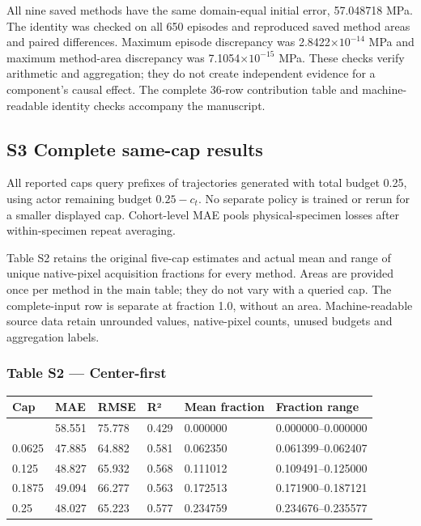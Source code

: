 \documentclass[11pt,a4paper]{article}
\begin{document}
All nine saved methods have the same domain-equal initial error, 57.048718 MPa. The identity was checked on all 650 episodes and reproduced saved method areas and paired differences. Maximum episode discrepancy was 2.8422×\(10^{-14}\) MPa and maximum method-area discrepancy was 7.1054×\(10^{-15}\) MPa. These checks verify arithmetic and aggregation; they do not create independent evidence for a component's causal effect. The complete 36-row contribution table and machine-readable identity checks accompany the manuscript.

\subsection{S3 Complete same-cap results}\label{s3-complete-same-cap-results}

All reported caps query prefixes of trajectories generated with total budget 0.25, using actor remaining budget \(0.25-c_t\). No separate policy is trained or rerun for a smaller displayed cap. Cohort-level MAE pools physical-specimen losses after within-specimen repeat averaging.

Table S2 retains the original five-cap estimates and actual mean and range of unique native-pixel acquisition fractions for every method. Areas are provided once per method in the main table; they do not vary with a queried cap. The complete-input row is separate at fraction 1.0, without an area. Machine-readable source data retain unrounded values, native-pixel counts, unused budgets and aggregation labels.

\subsubsection{Table S2 --- Center-first}\label{table-s2-center-first}

{ %
\begin{longtable}[]{@{}llllll@{}}
\toprule\noalign{}
Cap & MAE & RMSE & R² & Mean fraction & Fraction range \\
\midrule\noalign{}
\endhead
\bottomrule\noalign{}
\endlastfoot
0.0 & 58.551 & 75.778 & 0.429 & 0.000000 & 0.000000--0.000000 \\
0.0625 & 47.885 & 64.882 & 0.581 & 0.062350 & 0.061399--0.062407 \\
0.125 & 48.827 & 65.932 & 0.568 & 0.111012 & 0.109491--0.125000 \\
0.1875 & 49.094 & 66.277 & 0.563 & 0.172513 & 0.171900--0.187121 \\
0.25 & 48.027 & 65.223 & 0.577 & 0.234759 & 0.234676--0.235577 \\
\end{longtable}
}
\end{document}
